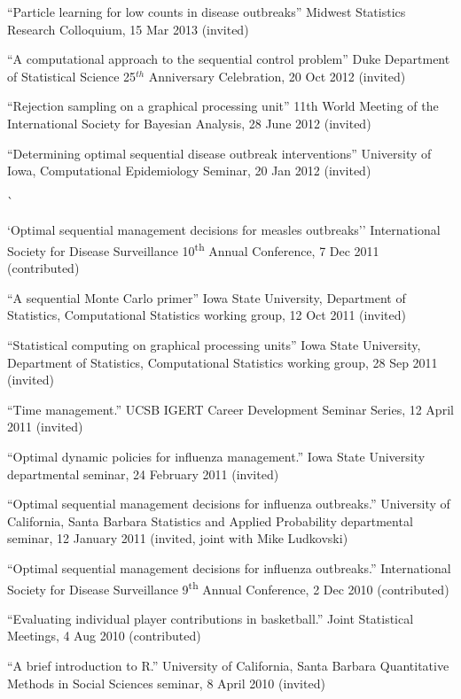 \documentclass[overlapped,line]{res}
\begin{document}
\begin{resume}
{``Particle learning for low counts in disease outbreaks'' Midwest Statistics Research Colloquium, 15 Mar 2013 (invited)

``A computational approach to the sequential control problem'' Duke Department of Statistical Science 25$^{th}$ Anniversary Celebration, 20 Oct 2012 (invited)

``Rejection sampling on a graphical processing unit'' 11th World Meeting of the International Society for Bayesian Analysis, 28 June 2012 (invited)

``Determining optimal sequential disease outbreak interventions'' University of Iowa, Computational Epidemiology Seminar, 20 Jan 2012 (invited)


\newpage \opening

``Optimal sequential management decisions for measles outbreaks'' International Society for Disease Surveillance 10\textsuperscript{th} Annual Conference, 7 Dec 2011 (contributed)



``A sequential Monte Carlo primer'' Iowa State University, Department of Statistics, Computational Statistics working group, 12 Oct 2011 (invited)


``Statistical computing on graphical processing units'' Iowa State University, Department of Statistics, Computational Statistics working group, 28 Sep 2011 (invited)

``Time management.'' UCSB IGERT Career Development Seminar Series, 12 April 2011 (invited)



``Optimal dynamic policies for influenza management.'' Iowa State University departmental seminar, 24 February 2011 (invited)

``Optimal sequential management decisions for influenza outbreaks.'' University of California, Santa Barbara Statistics and Applied Probability departmental seminar, 12 January 2011 (invited, joint with Mike Ludkovski)

``Optimal sequential management decisions for influenza outbreaks.'' International Society for Disease Surveillance 9\textsuperscript{th} Annual Conference, 2 Dec 2010 (contributed)


``Evaluating individual player contributions in basketball.'' Joint Statistical Meetings, 4 Aug 2010 (contributed)

``A brief introduction to R.'' University of California, Santa Barbara Quantitative Methods in Social Sciences seminar, 8 April 2010 (invited)

}
\end{resume}
\end{document}
